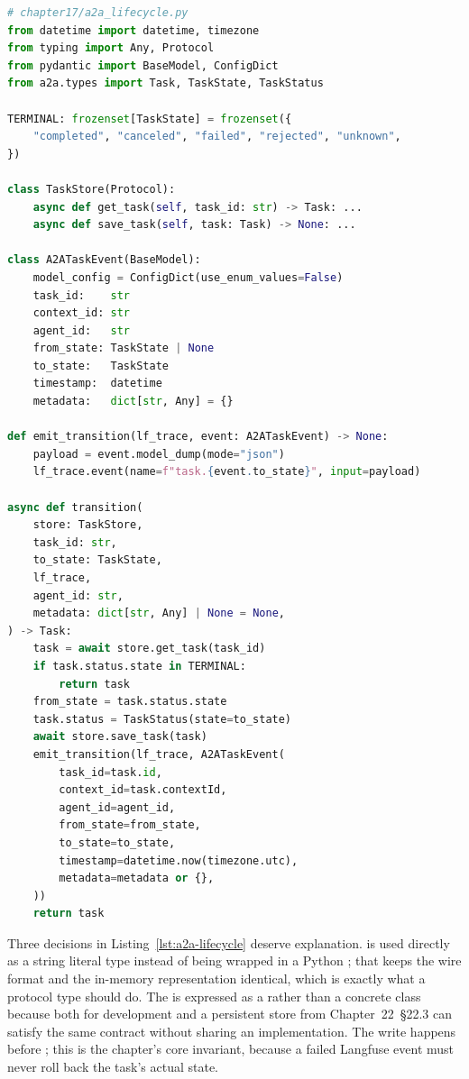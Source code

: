 \begin{lstlisting}[language=Python,
  caption={Task lifecycle: atomic transition with validated event emission},
  label={lst:a2a-lifecycle}]
# chapter17/a2a_lifecycle.py
from datetime import datetime, timezone
from typing import Any, Protocol
from pydantic import BaseModel, ConfigDict
from a2a.types import Task, TaskState, TaskStatus

TERMINAL: frozenset[TaskState] = frozenset({
    "completed", "canceled", "failed", "rejected", "unknown",
})

class TaskStore(Protocol):
    async def get_task(self, task_id: str) -> Task: ...
    async def save_task(self, task: Task) -> None: ...

class A2ATaskEvent(BaseModel):
    model_config = ConfigDict(use_enum_values=False)
    task_id:    str
    context_id: str
    agent_id:   str
    from_state: TaskState | None
    to_state:   TaskState
    timestamp:  datetime
    metadata:   dict[str, Any] = {}

def emit_transition(lf_trace, event: A2ATaskEvent) -> None:
    payload = event.model_dump(mode="json")
    lf_trace.event(name=f"task.{event.to_state}", input=payload)

async def transition(
    store: TaskStore,
    task_id: str,
    to_state: TaskState,
    lf_trace,
    agent_id: str,
    metadata: dict[str, Any] | None = None,
) -> Task:
    task = await store.get_task(task_id)
    if task.status.state in TERMINAL:
        return task
    from_state = task.status.state
    task.status = TaskStatus(state=to_state)
    await store.save_task(task)
    emit_transition(lf_trace, A2ATaskEvent(
        task_id=task.id,
        context_id=task.contextId,
        agent_id=agent_id,
        from_state=from_state,
        to_state=to_state,
        timestamp=datetime.now(timezone.utc),
        metadata=metadata or {},
    ))
    return task
\end{lstlisting}

Three decisions in Listing~\ref{lst:a2a-lifecycle} deserve explanation.
 is used directly as a string literal type instead of
being wrapped in a Python ; that keeps the wire format and the
in-memory representation identical, which is exactly what a protocol type
should do. The  is expressed as a  rather
than a concrete class because both  for
development and a persistent store from Chapter~22~\S22.3 can satisfy the
same contract without sharing an implementation. The write happens before
; this is the chapter's core invariant, because
a failed Langfuse event must never roll back the task's actual state.

